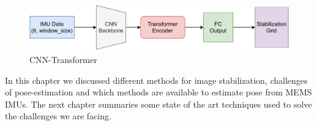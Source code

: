 \begin{figure}[H]
    \centering
    \includegraphics[scale=0.7]{images/fig_chapter2/nns/transformer_cnn.pdf}
    \caption{CNN-Transformer}
    \label{fig:transformer_cnn}
\end{figure}


In this chapter we discussed different methods for image stabilization, challenges of pose-estimation  and which methods are available to estimate pose from MEMS IMUs. The next chapter summaries some state of the art techniques used to solve the challenges we are facing.
